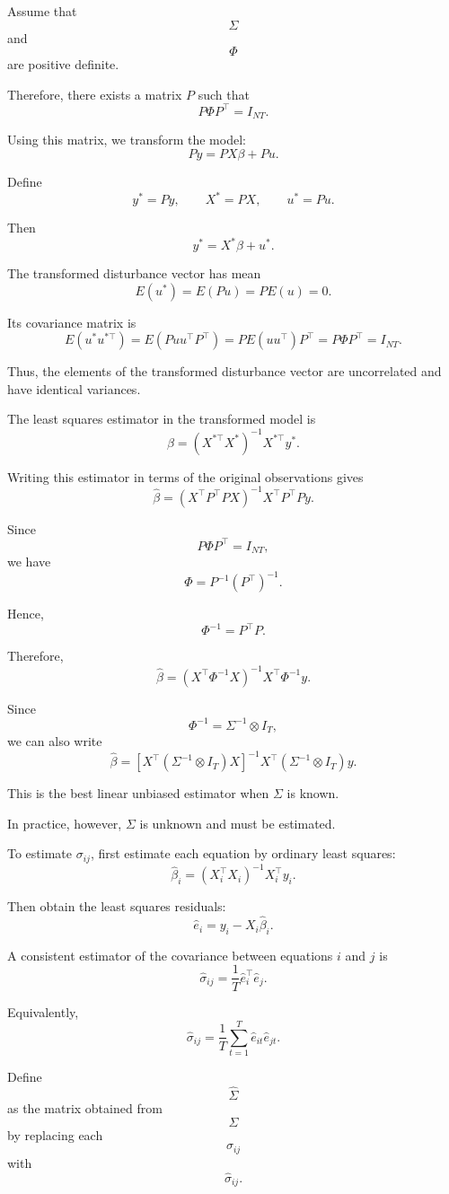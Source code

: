 Assume that
\[
\Sigma
\]
and
\[
\Phi
\]
are positive definite.

Therefore, there exists a matrix \(P\) such that
\[
P\Phi P^\top=I_{NT}.
\]

Using this matrix, we transform the model:
\[
Py=PX\beta+Pu.
\]

Define
\[
y^*=Py,
\qquad
X^*=PX,
\qquad
u^*=Pu.
\]

Then
\[
y^*=X^*\beta+u^*.
\]

The transformed disturbance vector has mean
\[
E(u^*)=E(Pu)=PE(u)=0.
\]

Its covariance matrix is
\[
E(u^*u^{*\top})
=
E(Puu^\top P^\top)
=
PE(uu^\top)P^\top
=
P\Phi P^\top
=
I_{NT}.
\]

Thus, the elements of the transformed disturbance vector are uncorrelated and have identical variances.

The least squares estimator in the transformed model is
\[
\hat\beta
=
(X^{*\top}X^*)^{-1}X^{*\top}y^*.
\]

Writing this estimator in terms of the original observations gives
\[
\hat\beta
=
(X^\top P^\top PX)^{-1}X^\top P^\top Py.
\]

Since
\[
P\Phi P^\top=I_{NT},
\]
we have
\[
\Phi=P^{-1}(P^\top)^{-1}.
\]

Hence,
\[
\Phi^{-1}=P^\top P.
\]

Therefore,
\[
\hat\beta
=
(X^\top\Phi^{-1}X)^{-1}
X^\top\Phi^{-1}y.
\]

Since
\[
\Phi^{-1}
=
\Sigma^{-1}\otimes I_T,
\]
we can also write
\[
\hat\beta
=
\left[
X^\top(\Sigma^{-1}\otimes I_T)X
\right]^{-1}
X^\top(\Sigma^{-1}\otimes I_T)y.
\]

This is the best linear unbiased estimator when \(\Sigma\) is known.

In practice, however, \(\Sigma\) is unknown and must be estimated.

To estimate \(\sigma_{ij}\), first estimate each equation by ordinary least squares:
\[
\hat\beta_i
=
(X_i^\top X_i)^{-1}X_i^\top y_i.
\]

Then obtain the least squares residuals:
\[
\hat e_i
=
y_i-X_i\hat\beta_i.
\]

A consistent estimator of the covariance between equations \(i\) and \(j\) is
\[
\hat\sigma_{ij}
=
\frac{1}{T}
\hat e_i^\top \hat e_j.
\]

Equivalently,
\[
\hat\sigma_{ij}
=
\frac{1}{T}
\sum_{t=1}^T
\hat e_{it}\hat e_{jt}.
\]

Define
\[
\hat\Sigma
\]
as the matrix obtained from
\[
\Sigma
\]
by replacing each
\[
\sigma_{ij}
\]
with
\[
\hat\sigma_{ij}.
\]

